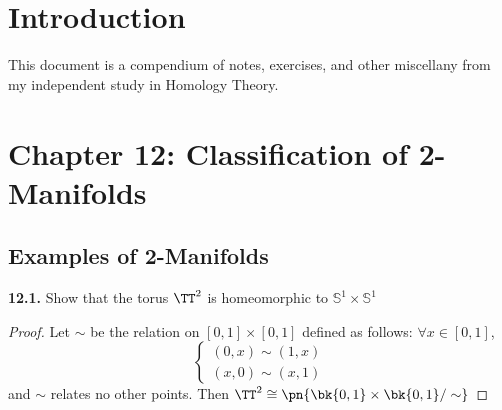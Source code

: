\documentclass{fkbook}
\newenvironment{problem}[1][Problem \thesection.]
{\begin{boxedminipage}{\linewidth}\textbf{#1.}}
{\end{boxedminipage}}
\begin{document}
\pagestyle{plain}
\frontmatter


\maketitlepage
\tableofcontents
\mainmatter
\chapter{Introduction}
\pagestyle{main}
This document is a compendium of notes, exercises, and other miscellany from my
independent study in Homology Theory.

\chapter{Chapter 12: Classification of 2-Manifolds}

\section{Examples of 2-Manifolds}
\begin{problem}[12.1]
  Show that the torus $\TT^2$ is homeomorphic to $\mathbb{S}^1 \times
  \mathbb{S}^1$
\end{problem}
\begin{proof}
  Let $\sim$ be the relation on $[0,1] \times [0,1]$ defined as follows:
  $\forall x \in [0,1]$,
  \[
    \begin{cases}
      (0,x) \sim (1,x) \\
      (x,0) \sim (x,1)
    \end{cases}
  \]
  and $\sim$ relates no other points. Then $\TT^2 \cong \pn{\bk{0,1} \times
    \bk{0,1} / \sim}$
\end{proof}
\end{document}
